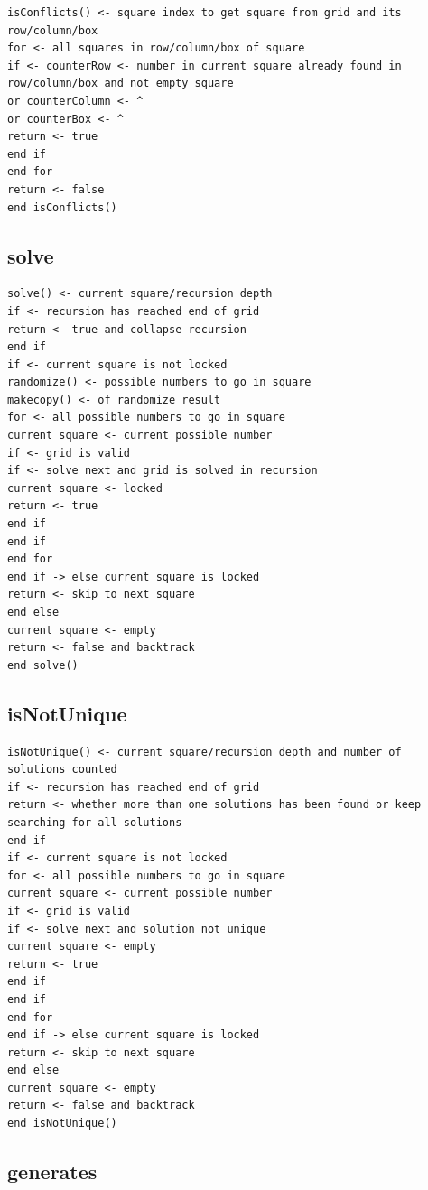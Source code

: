\documentclass[]{final_report}
\begin{document}
\begin{verbatim}
isConflicts() <- square index to get square from grid and its row/column/box
for <- all squares in row/column/box of square
if <- counterRow <- number in current square already found in row/column/box and not empty square
or counterColumn <- ^
or counterBox <- ^
return <- true
end if
end for
return <- false
end isConflicts()
\end{verbatim}

\subsection*{solve}

\begin{verbatim}
solve() <- current square/recursion depth
if <- recursion has reached end of grid
return <- true and collapse recursion
end if
if <- current square is not locked
randomize() <- possible numbers to go in square
makecopy() <- of randomize result
for <- all possible numbers to go in square
current square <- current possible number
if <- grid is valid
if <- solve next and grid is solved in recursion
current square <- locked
return <- true
end if
end if
end for
end if -> else current square is locked
return <- skip to next square
end else
current square <- empty
return <- false and backtrack
end solve()
\end{verbatim}

\subsection*{isNotUnique}

\begin{verbatim}
isNotUnique() <- current square/recursion depth and number of solutions counted
if <- recursion has reached end of grid
return <- whether more than one solutions has been found or keep searching for all solutions
end if
if <- current square is not locked
for <- all possible numbers to go in square
current square <- current possible number
if <- grid is valid
if <- solve next and solution not unique
current square <- empty
return <- true
end if
end if
end for
end if -> else current square is locked
return <- skip to next square
end else
current square <- empty
return <- false and backtrack
end isNotUnique()
\end{verbatim}

\subsection*{generates}
\end{document}
